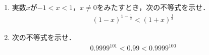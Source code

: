 \documentclass[../../main.tex]{subfiles}
\begin{document}
\begin{enumerate}
  \item 実数$x$が$-1<x<1$，$x\neq0$をみたすとき，次の不等式を示せ．
    \begin{align}
      {(1-x)}^{1-\frac{1}{x}}<{(1+x)}^{\frac{1}{x}}
    \end{align}
  \item 次の不等式を示せ．
    \begin{align}
      {0.9999}^{101}<0.99<{0.9999}^{100}
    \end{align}
\end{enumerate}
\end{document}
